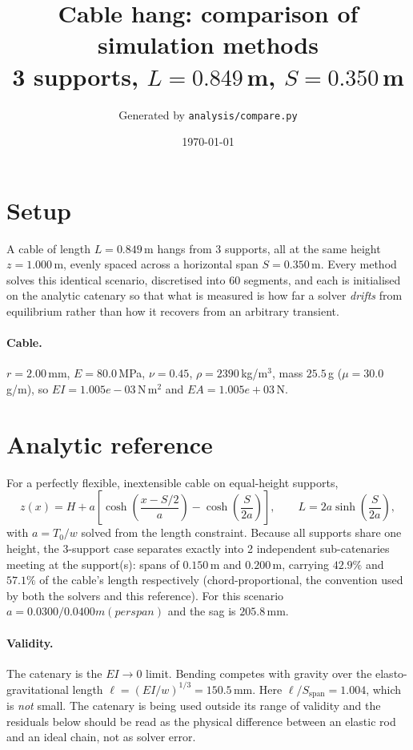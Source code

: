\documentclass[11pt,a4paper]{article}
\title{Cable hang: comparison of simulation methods\\
\large 3 supports, $L = 0.849$\,m,
$S = 0.350$\,m}
\author{Generated by \texttt{analysis/compare.py}}
\date{\today}
\begin{document}
\maketitle

\section{Setup}

A cable of length $L = 0.849$\,m hangs from
3 supports, all at the same height
$z = 1.000$\,m, evenly spaced across a horizontal span
$S = 0.350$\,m. Every method solves this identical scenario,
discretised into 60 segments, and each is initialised on
the analytic catenary so that what is measured is how far a solver
\emph{drifts} from equilibrium rather than how it recovers from an arbitrary
transient.

\paragraph{Cable.} $r = 2.00$\,mm,
$E = 80.0$\,MPa, $\nu = 0.45$,
$\rho = 2390$\,kg/m$^3$, mass $25.5$\,g
($\mu = 30.0$\,g/m), so
$EI = 1.005e-03$\,N\,m$^2$ and
$EA = 1.005e+03$\,N.

\section{Analytic reference}

For a perfectly flexible, inextensible cable on equal-height supports,
\begin{equation}
  z(x) = H + a\left[\cosh\!\left(\frac{x - S/2}{a}\right)
                    - \cosh\!\left(\frac{S}{2a}\right)\right],
  \qquad L = 2a\sinh\!\left(\frac{S}{2a}\right),
\end{equation}
with $a = T_0/w$ solved from the length constraint. Because all supports share
one height, the 3-support case separates exactly into
2 independent sub-catenaries meeting at the support(s):
spans of $0.150$\,m and $0.200$\,m, carrying $42.9\%$ and $57.1\%$ of the cable's length respectively (chord-proportional, the convention used by both the solvers and this reference).
For this scenario $a = 0.0300 / 0.0400 m (per span)$ and the sag is
$205.8$\,mm.

\paragraph{Validity.} The catenary is the $EI \to 0$ limit. Bending competes
with gravity over the elasto-gravitational length
$\ell = (EI/w)^{1/3} = 150.5$\,mm. Here $\ell/S_{\mathrm{span}} = 1.004$, which is \emph{not} small. The catenary is being used outside its range of validity and the residuals below should be read as the physical difference between an elastic rod and an ideal chain, not as solver error.
\end{document}
